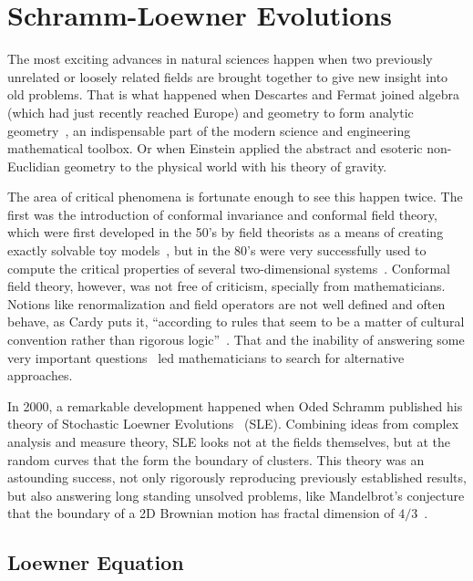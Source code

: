 \chapter{Schramm-Loewner Evolutions}
\label{ch:sle}

The most exciting advances in natural sciences happen when two previously
unrelated or loosely related fields are brought together to give new insight
into old problems. That is what happened when Descartes and Fermat joined
algebra (which had just recently reached Europe) and geometry to form analytic
geometry~\cite{Stillwell2010}, an indispensable part of the modern science and
engineering mathematical toolbox. Or when Einstein applied the abstract and
esoteric non-Euclidian geometry to the physical world with his theory of
gravity.

The area of critical phenomena is fortunate enough to see this happen twice.
The first was the introduction of conformal invariance and conformal field
theory, which were first developed in the 50's by field theorists as a means of
creating exactly solvable toy models~\cite{Thirring1958}, but in the 80's were
very successfully used to compute the critical properties of several
two-dimensional systems~\cite{Nahm2000}. Conformal field theory, however, was
not free of criticism, specially from mathematicians. Notions like
renormalization and field operators are not well defined and often behave, as
Cardy puts it, ``according to rules that seem to be a matter of cultural
convention rather than rigorous logic''~\cite{Cardy2005}. That and the
inability of answering some very important questions~\cite{Langlands1994} led
mathematicians to search for alternative approaches.

In 2000, a remarkable development happened when Oded Schramm published his
theory of Stochastic Loewner Evolutions~\cite{Schramm2000} (SLE). Combining
ideas from complex analysis and measure theory, SLE looks not at the fields
themselves, but at the random curves that the form the boundary of clusters.
This theory was an astounding success, not only rigorously reproducing
previously established results, but also answering long standing unsolved
problems, like Mandelbrot's conjecture that the boundary of a 2D Brownian
motion has fractal dimension of $4/3$~\cite{Lawler2001a}.


\section{Loewner Equation}
\label{sec:le}

